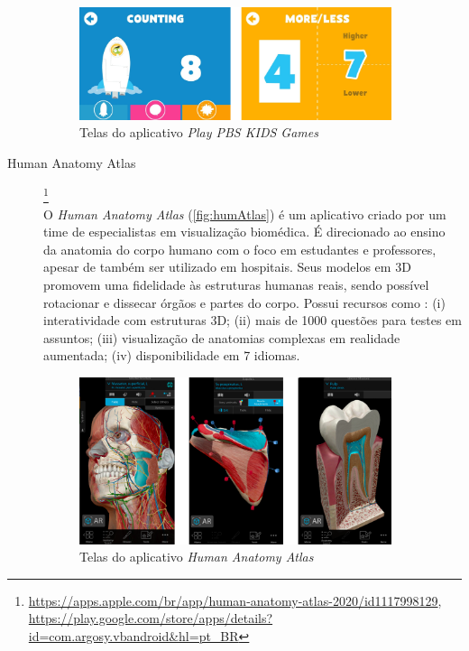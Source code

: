 \begin{description}
\begin{figure}[H]
\centering
    \includegraphics[width=0.9\textwidth]{Figuras/pbsKids.jpg}
    \caption{Telas do aplicativo \textit{Play PBS KIDS Games}}
    \label{fig:pbs}
\end{figure}

\item[Human Anatomy Atlas]\footnote{\url{https://apps.apple.com/br/app/human-anatomy-atlas-2020/id1117998129}, \url{https://play.google.com/store/apps/details?id=com.argosy.vbandroid&hl=pt_BR}} \hfill \\
O \textit{Human Anatomy Atlas} (\autoref{fig:humAtlas}) é um aplicativo criado por um time de especialistas em visualização biomédica. É direcionado ao ensino da anatomia do corpo humano com o foco em estudantes e professores, apesar de também ser utilizado em hospitais. Seus modelos em 3D promovem uma fidelidade às estruturas humanas reais, sendo possível rotacionar e dissecar órgãos e partes do corpo. Possui recursos como : (i) interatividade com estruturas 3D; (ii) mais de 1000 questões para testes em assuntos; (iii) visualização de anatomias complexas em realidade aumentada; (iv) disponibilidade em 7 idiomas.

\begin{figure}[ht!]
\centering
    \includegraphics[width=0.9\textwidth]{Figuras/humanAtlas.png}
    \caption{Telas do aplicativo \textit{Human Anatomy Atlas}}
    \label{fig:humAtlas}
\end{figure}


\end{description}
